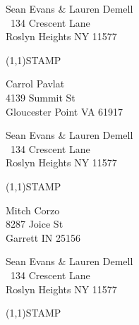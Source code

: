 \documentclass[12pt]{article}
\begin{document}
\begin{minipage}{.5\linewidth} \noindent
Sean Evans \& Lauren Demell\\\ 
134 Crescent Lane\\ 
Roslyn Heights NY 11577
\end{minipage}
\begin{minipage}{.5\linewidth \hspace{-.2in} \vspace{-.3in}}
\begin{flushright}
\framebox(1,1){STAMP}
\end{flushright}
\end{minipage}

\begin{center} \begin{Huge} \vspace*{\fill}
Carrol Pavlat\\
4139 Summit St\\
Gloucester Point VA 61917\\
\vspace{\fill} \end{Huge} \end{center}

\clearpage

\begin{minipage}{.5\linewidth} \noindent
Sean Evans \& Lauren Demell\\\ 
134 Crescent Lane\\ 
Roslyn Heights NY 11577
\end{minipage}
\begin{minipage}{.5\linewidth \hspace{-.2in} \vspace{-.3in}}
\begin{flushright}
\framebox(1,1){STAMP}
\end{flushright}
\end{minipage}

\begin{center} \begin{Huge} \vspace*{\fill}
Mitch Corzo\\
8287 Joice St\\
Garrett IN 25156\\
\vspace{\fill} \end{Huge} \end{center}

\clearpage

\begin{minipage}{.5\linewidth} \noindent
Sean Evans \& Lauren Demell\\\ 
134 Crescent Lane\\ 
Roslyn Heights NY 11577
\end{minipage}
\begin{minipage}{.5\linewidth \hspace{-.2in} \vspace{-.3in}}
\begin{flushright}
\framebox(1,1){STAMP}
\end{flushright}
\end{minipage}
\end{document}
